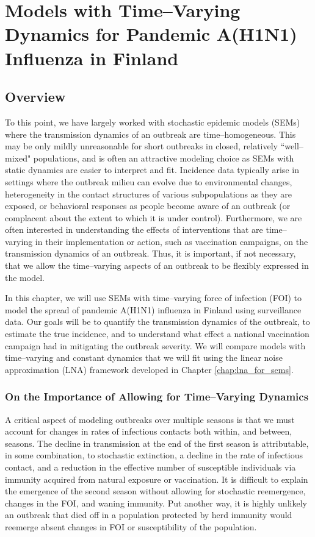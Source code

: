 \chapter{Models with Time--Varying Dynamics for Pandemic A(H1N1) Influenza in Finland}
\label{chap:lna_extensions}

\section{Overview}
\label{sec:lna_extensions_overview}
To this point, we have largely worked with stochastic epidemic models (SEMs) where the transmission dynamics of an outbreak are time--homogeneous. This may be only mildly unreasonable for short outbreaks in closed, relatively ``well--mixed" populations, and is often an attractive modeling choice as SEMs with static dynamics are easier to interpret and fit. Incidence data typically arise in settings where the outbreak milieu can evolve due to environmental changes, heterogeneity in the contact structures of various subpopulations as they are exposed, or behavioral responses as people become aware of an outbreak (or complacent about the extent to which it is under control). Furthermore, we are often interested in understanding the effects of interventions that are time--varying in their implementation or action, such as vaccination campaigns, on the transmission dynamics of an outbreak. Thus, it is important, if not necessary, that we allow the time--varying aspects of an outbreak to be flexibly expressed in the model.

In this chapter, we will use SEMs with time--varying force of infection (FOI) to model the spread of pandemic A(H1N1) influenza in Finland using surveillance data. Our goals will be to quantify the transmission dynamics of the outbreak, to estimate the true incidence, and to understand what effect a national vaccination campaign had in mitigating the outbreak severity. We will compare models with time--varying and constant dynamics that we will fit using the linear noise approximation (LNA) framework developed in Chapter \ref{chap:lna_for_sems}.

\subsection{On the Importance of Allowing for Time--Varying Dynamics}
\label{subsec:tparam_motivation}

A critical aspect of modeling outbreaks over multiple seasons is that we must account for changes in rates of infectious contacts both within, and between, seasons. The decline in transmission at the end of the first season is attributable, in some combination, to stochastic extinction, a decline in the rate of infectious contact, and a reduction in the effective number of susceptible individuals via immunity acquired from natural exposure or vaccination. It is difficult to explain the emergence of the second season without allowing for stochastic reemergence, changes in the FOI, and waning immunity. Put another way, it is highly unlikely an outbreak that died off in a population protected by herd immunity would reemerge absent changes in FOI or susceptibility of the population. 

